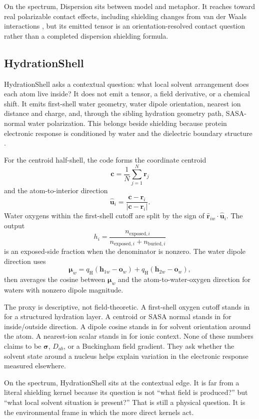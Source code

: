 \documentclass[11pt]{article}
\begin{document}
On the spectrum, Dispersion sits between model and metaphor. It reaches toward
real polarizable contact effects, including shielding changes from
van der Waals interactions \cite{kromhout1969}, but its emitted tensor is an
orientation-resolved contact question rather than a completed dispersion
shielding formula.

\subsection{HydrationShell}

HydrationShell asks a contextual question: what local solvent arrangement does
each atom live inside? It does not emit a tensor, a field derivative, or a
chemical shift. It emits first-shell water geometry, water dipole orientation,
nearest ion distance and charge, and, through the sibling hydration geometry
path, SASA-normal water polarization. This belongs beside shielding because
protein electronic response is conditioned by water and the dielectric
boundary structure \cite{nakasako2004,halle2004,martin2015}.

For the centroid half-shell, the code forms the coordinate centroid
\[
  \bm c=\frac1N\sum_{j=1}^N\bm r_j
\]
and the atom-to-interior direction
\[
  \hat{\bm u}_i=\frac{\bm c-\bm r_i}{|\bm c-\bm r_i|}.
\]
Water oxygens within the first-shell cutoff are split by the sign of
\(\hat{\bm r}_{iw}\cdot\hat{\bm u}_i\). The output
\[
  h_i=
  \frac{n_{\mathrm{exposed},i}}
       {n_{\mathrm{exposed},i}+n_{\mathrm{buried},i}}
\]
is an exposed-side fraction when the denominator is nonzero. The water dipole
direction uses
\[
  \bm\mu_w
  =
  q_{\mathrm H}(\bm h_{1w}-\bm o_w)
  +
  q_{\mathrm H}(\bm h_{2w}-\bm o_w),
\]
then averages the cosine between \(\bm\mu_w\) and the atom-to-water-oxygen
direction for waters with nonzero dipole magnitude.

The proxy is descriptive, not field-theoretic. A first-shell oxygen cutoff
stands in for a structured hydration layer. A centroid or SASA normal stands in
for inside/outside direction. A dipole cosine stands in for solvent orientation
around the atom. A nearest-ion scalar stands in for ionic context. None of these
numbers claims to be \(\bm\sigma\), \(D_{ab}\), or a Buckingham field gradient.
They ask whether the solvent state around a nucleus helps explain variation in
the electronic response measured elsewhere.

On the spectrum, HydrationShell sits at the contextual edge. It is far from a
literal shielding kernel because its question is not ``what field is produced?''
but ``what local solvent situation is present?'' That is still a physical
question. It is the environmental frame in which the more direct kernels act.
\end{document}
